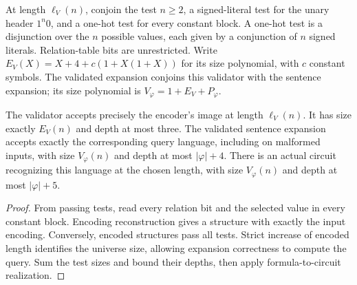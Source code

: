 \begin{definition}
  \label{def:desc-encoding-validator}
  \leanok
  At length $\ell_V(n)$, conjoin the test $n\ge2$, a signed-literal test for the
  unary header $1^n0$, and a one-hot test for every constant block. A one-hot test
  is a disjunction over the $n$ possible values, each given by a conjunction of
  $n$ signed literals. Relation-table bits are unrestricted. Write
  $E_V(X)=X+4+c(1+X(1+X))$ for its size polynomial, with $c$ constant symbols.
  The validated expansion conjoins this validator with the sentence expansion;
  its size polynomial is $V_\varphi=1+E_V+P_\varphi$.
\end{definition}

\begin{theorem}
  \label{thm:desc-encoding-validator}
  \leanok
  The validator accepts precisely the encoder's image at length $\ell_V(n)$.
  It has size exactly $E_V(n)$ and depth at most three. The validated sentence
  expansion accepts exactly the corresponding query language, including on
  malformed inputs, with size $V_\varphi(n)$ and depth at most $|\varphi|+4$.
  There is an actual circuit recognizing this language at the chosen length,
  with size $V_\varphi(n)$ and depth at most $|\varphi|+5$.
\end{theorem}
\begin{proof}
  \leanok
  From passing tests, read every relation bit and the selected value in every
  constant block. Encoding reconstruction gives a structure with exactly the
  input encoding. Conversely, encoded structures pass all tests. Strict increase
  of encoded length identifies the universe size, allowing expansion correctness
  to compute the query. Sum the test sizes and bound their depths, then apply
  formula-to-circuit realization.
\end{proof}

